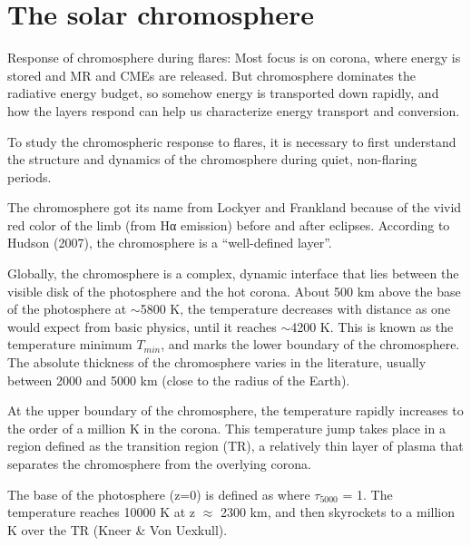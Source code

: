 \section{The solar chromosphere}




Response of chromosphere during flares:
Most focus is on corona, where energy
is stored and MR and CMEs are released.
But chromosphere dominates the
radiative energy budget, so somehow energy is transported down rapidly, and how
the layers respond can help us characterize energy transport and
conversion.%
%




To study the chromospheric response to flares, it is necessary
to first understand the structure and dynamics of the chromosphere
during quiet, non-flaring periods.

The chromosphere got its name from Lockyer and Frankland because of the vivid
red color of the limb (from Hα emission) before and after eclipses.
According to Hudson (2007), the chromosphere is a ``well-defined layer''.

Globally, the chromosphere is a complex, dynamic interface that lies between
the visible disk of the photosphere and the hot corona.
About 500 km above the base of the photosphere at $\sim$5800 K, the temperature
decreases with distance as one would expect from basic physics,
until it reaches $\sim$4200 K.
This is known as the temperature minimum $T_{min}$, and
marks the lower boundary of the chromosphere.
The absolute
thickness of the chromosphere varies in the literature, usually between 2000
and 5000 km (close to the radius of the Earth).

At the upper boundary of the chromosphere, the temperature rapidly increases to
the order of a million K in the corona.
This temperature jump takes place in a region defined as the transition
region (TR), a relatively thin layer of plasma that separates the chromosphere
from the overlying corona.

The base of the photosphere (z=0) is defined as where
$\tau_{5000}$ = 1.
The temperature reaches 10000 K at z $\approx$ 2300 km, and then skyrockets
to a million K over the TR (Kneer \& Von Uexkull).



